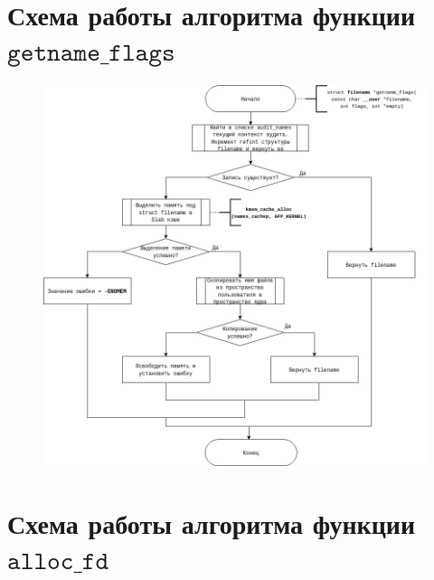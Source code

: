 \documentclass[12pt]{report}
\begin{document}
\section{Схема работы алгоритма функции $\texttt{getname\_flags}$}

\begin{figure}[H]
	\centering
	\includegraphics[scale=0.4]{img/getname_flags.jpg}
	\label{fig:get_name_flags}
\end{figure}

\section{Схема работы алгоритма функции $\texttt{alloc\_fd}$}
\end{document}
